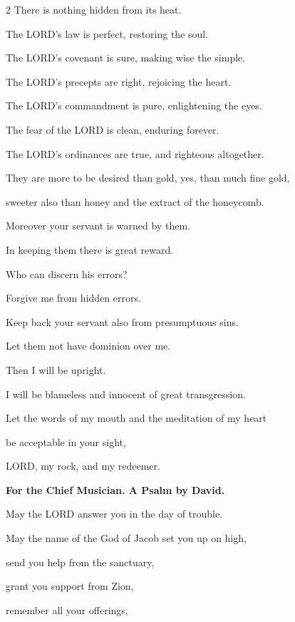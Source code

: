 \begin{multicols}{2}
	There is nothing hidden from its heat.
	
	\vspace{\baselineskip}
	
	\myverse{}The LORD’s law is perfect, restoring the soul.
	
	The LORD’s covenant is sure, making wise the simple.
	
	
	\myverse{}The LORD’s precepts are right, rejoicing the heart.
	
	The LORD’s commandment is pure, enlightening the eyes.
	
	
	\myverse{}The fear of the LORD is clean, enduring forever.
	
	The LORD’s ordinances are true, and righteous altogether.
	
	
	\myverse{}They are more to be desired than gold, yes, than much fine
	gold,
	
	sweeter also than honey and the extract of the honeycomb.
	
	
	\myverse{}Moreover your servant is warned by them.
	
	In keeping them there is great reward.
	
	
	\myverse{}Who can discern his errors?
	
	Forgive me from hidden errors.
	
	\vspace{\baselineskip}
	
	\myverse{}Keep back your servant also from presumptuous sins.
	
	Let them not have dominion over me.
	
	Then I will be upright.
	
	I will be blameless and innocent of great transgression.
	
	
	\myverse{}Let the words of my mouth and the meditation of my heart
	
	be acceptable in your sight,
	
	LORD, my rock, and my redeemer.
	
	
	\mychapter{}\textbf{For the Chief Musician. A Psalm by David.}
	
	\quad \myverse*{}May the LORD answer you in the day of trouble.
	
	May the name of the God of Jacob set you up on high,
	
	
	\myverse{}send you help from the sanctuary,
	
	grant you support from Zion,
	
	
	\myverse{}remember all your offerings,
	

\end{multicols}
